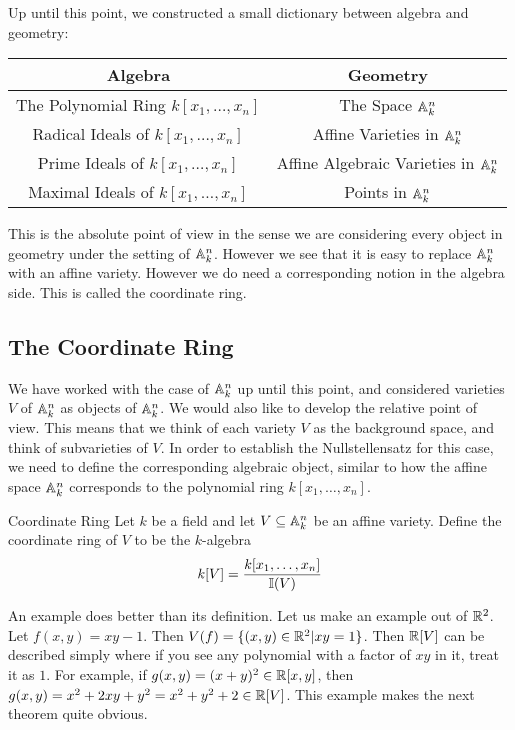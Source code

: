 \documentclass[a4paper]{article}
\begin{document}
Up until this point, we constructed a small dictionary between algebra and geometry: \\
\begin{center}\begin{tabular}{c|c}
Algebra & Geometry\\
\hline
The Polynomial Ring $k[x_1,\dots,x_n]$ & The Space $\mathbb{A}_k^n$\\
Radical Ideals of $k[x_1,\dots,x_n]$ & Affine Varieties in $\mathbb{A}_k^n$\\
Prime Ideals of $k[x_1,\dots,x_n]$ & Affine Algebraic Varieties in $\mathbb{A}_k^n$\\
Maximal Ideals of $k[x_1,\dots,x_n]$ & Points in $\mathbb{A}_k^n$
\end{tabular}\end{center}

This is the absolute point of view in the sense we are considering every object in geometry under the setting of $\mathbb{A}_k^n$. However we see that it is easy to replace $\mathbb{A}_k^n$ with an affine variety. However we do need a corresponding notion in the algebra side. This is called the coordinate ring. 

\subsection{The Coordinate Ring}
We have worked with the case of $\mathbb{A}_k^n$ up until this point, and considered varieties $V$ of $\mathbb{A}_k^n$  as objects of $\mathbb{A}_k^n$. We would also like to develop the relative point of view. This means that we think of each variety $V$ as the background space, and think of subvarieties of $V$. In order to establish the Nullstellensatz for this case, we need to define the corresponding algebraic object, similar to how the affine space $\mathbb{A}_k^n$ corresponds to the polynomial ring $k[x_1,\dots,x_n]$. 

\begin{defn}{Coordinate Ring}{} Let $k$ be a field and let $V\subseteq\mathbb{A}_k^n$ be an affine variety. Define the coordinate ring of $V$ to be the $k$-algebra $$k[V]=\frac{k[x_1,\dots,x_n]}{\mathbb{I}(V)}$$
\end{defn}

An example does better than its definition. Let us make an example out of $\mathbb{R}^2$. Let $f(x,y)=xy-1$. Then $V(f)=\{(x,y)\in\mathbb{R}^2|xy=1\}$. Then $\mathbb{R}[V]$ can be described simply where if you see any polynomial with a factor of $xy$ in it, treat it as $1$. For example, if $g(x,y)=(x+y)^2\in\mathbb{R}[x,y]$, then $g(x,y)=x^2+2xy+y^2=x^2+y^2+2\in\mathbb{R}[V]$. This example makes the next theorem quite obvious. 
\end{document}
